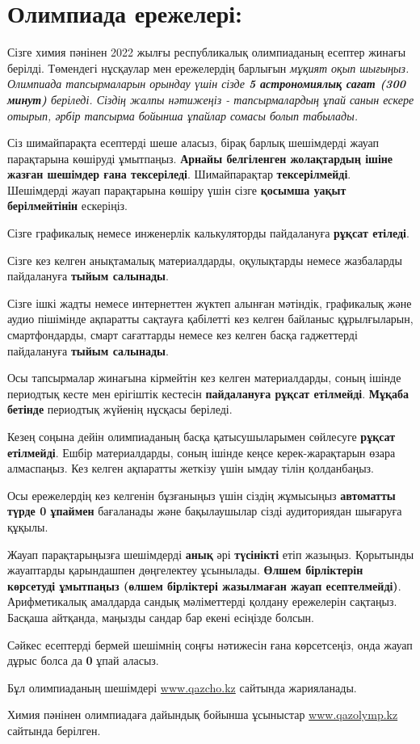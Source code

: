 \section*{Олимпиада ережелері:}\vspace{5pt}

\begin{regulations}
Сізге химия пәнінен 2022 жылғы республикалық олимпиаданың есептер жинағы берілді. Төмендегі нұсқаулар мен ережелердің барлығын \em{мұқият} оқып шығыңыз. Олимпиада тапсырмаларын орындау үшін сізде \textbf{5 астрономиялық сағат (300 минут)} беріледі. Сіздің жалпы нәтижеңіз - тапсырмалардың ұпай санын ескере отырып, әрбір тапсырма бойынша ұпайлар сомасы болып табылады.

Сіз шимайпарақта есептерді шеше аласыз, бірақ барлық шешімдерді жауап парақтарына көшіруді ұмытпаңыз. \textbf{Арнайы белгіленген жолақтардың ішіне жазған шешімдер ғана тексеріледі}. Шимайпарақтар \textbf{тексерілмейді}. Шешімдерді жауап парақтарына көшіру үшін сізге \textbf{қосымша уақыт берілмейтінін} ескеріңіз.

Сізге графикалық немесе инженерлік калькуляторды пайдалануға \textbf{рұқсат етіледі}.

Сізге кез келген анықтамалық материалдарды, оқулықтарды немесе жазбаларды пайдалануға \textbf{тыйым салынады}.

Сізге ішкі жадты немесе интернеттен жүктеп алынған мәтіндік, графикалық және аудио пішімінде ақпаратты сақтауға қабілетті кез келген байланыс құрылғыларын, смартфондарды, смарт сағаттарды немесе кез келген басқа гаджеттерді пайдалануға \textbf{тыйым салынады}.

Осы тапсырмалар жинағына кірмейтін кез келген материалдарды, соның ішінде периодтық кесте мен ерігіштік кестесін \textbf{пайдалануға рұқсат етілмейді}. \textbf{Мұқаба бетінде} периодтық жүйенің нұсқасы беріледі.

Кезең соңына дейін олимпиаданың басқа қатысушыларымен сөйлесуге \textbf{рұқсат етілмейді}. Ешбір материалдарды, соның ішінде кеңсе керек-жарақтарын өзара алмаспаңыз. Кез келген ақпаратты жеткізу үшін ымдау тілін қолданбаңыз.

Осы ережелердің кез келгенін бұзғаныңыз үшін сіздің жұмысыңыз \textbf{автоматты түрде 0 ұпаймен} бағаланады және бақылаушылар сізді аудиториядан шығаруға құқылы.

Жауап парақтарыңызға шешімдерді \textbf{анық} әрі \textbf{түсінікті} етіп жазыңыз. Қорытынды жауаптарды қарындашпен дөңгелектеу ұсынылады. \textbf{Өлшем бірліктерін көрсетуді ұмытпаңыз (өлшем бірліктері жазылмаған жауап есептелмейді)}. Арифметикалық амалдарда сандық мәліметтерді қолдану ережелерін сақтаңыз. Басқаша айтқанда, маңызды сандар бар екені есіңізде болсын.

Сәйкес есептерді бермей шешімнің соңғы нәтижесін ғана көрсетсеңіз, онда жауап дұрыс болса да \textbf{0} ұпай аласыз.

Бұл олимпиаданың шешімдері \href{https://www.qazcho.kz}{www.qazcho.kz} сайтында жарияланады.

Химия пәнінен олимпиадаға дайындық бойынша ұсыныстар \href{https://www.qazolymp.kz}{www.qazolymp.kz} сайтында берілген.
\end{regulations}